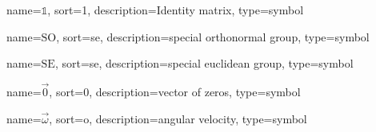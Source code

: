 	{%
		name=\ensuremath{\mathds{1}},
		sort=1,
		description=Identity matrix,
		type=symbol
	}
	\newcommand{\id}{\gls{sym:id}}

	{%
		name=\ensuremath{\mathrm{SO}},
		sort=se,
		description=special orthonormal group,
		type=symbol
	}
	\newcommand{\specialOrthonormalGroupbare}{\gls{sym:specialOrthonormalGroup}}
	\newcommand{\specialOrthonormalGroup}[1]{\ensuremath{\specialOrthonormalGroupbare_{#1}}}

	{%
		name=\ensuremath{\mathrm{SE}},
		sort=se,
		description=special euclidean group,
		type=symbol
	}
	\newcommand{\specialEuclideanGroupbare}{\gls{sym:specialEuclideanGroup}}
	\newcommand{\specialEuclideanGroup}[1]{\ensuremath{\specialEuclideanGroupbare_{#1}}}

	{%
		name=\ensuremath{\vec{0}},
		sort=0,
		description=vector of zeros,
		type=symbol
	}
	\newcommand{\zerovec}{\gls{sym:zerovec}}


	{%
		name=\ensuremath{\vec{\omega}},
		sort=o,
		description=angular velocity,
		type=symbol
	}
	\newcommand{\avel}{\gls{sym:avel}}

